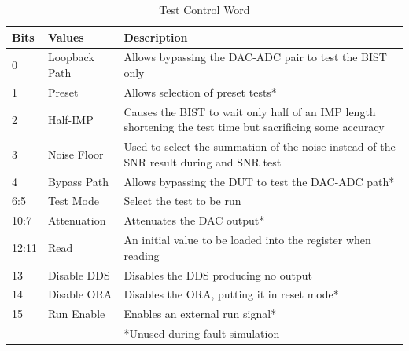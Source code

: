 \documentclass[12pt]{report}
\begin{document}
\begin{table}
	\begin{center}
		\begin{tabular}{|l|l|p{4.3in}|}
			\hline
			Bits & Values & Description \\ \hline
			0 & Loopback Path & Allows bypassing the DAC-ADC pair to test the BIST only \\ \hline
			1 & Preset & Allows selection of preset tests* \\ \hline
			2 & Half-IMP & Causes the BIST to wait only half of an IMP length shortening the test time but sacrificing some accuracy \\ \hline
			3 & Noise Floor & Used to select the summation of the noise instead of the SNR result during and SNR test \\ \hline
			4 & Bypass Path & Allows bypassing the DUT to test the DAC-ADC path* \\ \hline		
			6:5 & Test Mode & Select the test to be run \\ \hline
			10:7 & Attenuation & Attenuates the DAC output* \\ \hline
			12:11 & Read & An initial value to be loaded into the register when reading \\ \hline
			13 & Disable DDS & Disables the DDS producing no output \\ \hline
			14 & Disable ORA & Disables the ORA, putting it in reset mode* \\ \hline
			15 & Run Enable & Enables an external run signal* \\ \hline
			& & *Unused during fault simulation \\ \hline
		\end{tabular}
	\end{center}
	\caption{Test Control Word}
	\label{tbl:TestControlWord}
\end{table}
\end{document}
